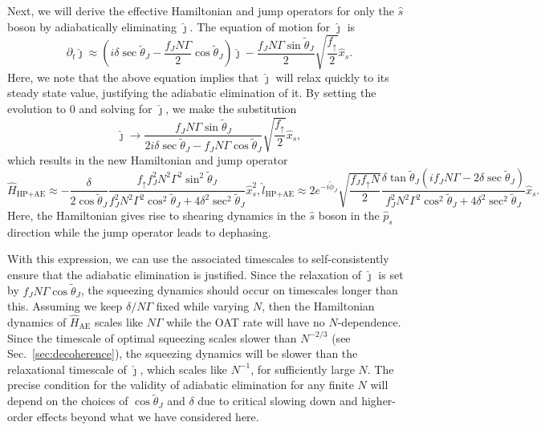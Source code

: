 \documentclass[11pt]{article}
\begin{document}
Next, we will derive the effective Hamiltonian and jump operators for only the $\hat s$ boson by adiabatically eliminating $\hat \jmath$. The equation of motion for $ \hat \jmath $ is
\begin{equation}
    \partial_t \hat \jmath \approx \left(i \delta \sec \tilde{\theta}_J - \frac{f_J N \Gamma}{2} \cos \tilde{\theta}_J \right) \hat \jmath  - \frac{f_J N \Gamma \sin \tilde{\theta}_J}{2}  \sqrt{\frac{f_{\uparrow}}{2}} \hat x_s.
\end{equation}
Here, we note that the above equation implies that $\hat \jmath$ will relax quickly to its steady state value, justifying the adiabatic elimination of it. By setting the evolution to 0 and solving for $\hat \jmath$, we make the substitution
\begin{equation}
    \hat \jmath \to \frac{f_J N \Gamma \sin \tilde{\theta}_J}{2 i \delta \sec \tilde{\theta}_J - f_J N \Gamma \cos \tilde{\theta}_J} \sqrt{\frac{f_{\uparrow}}{2}} \hat x_s,
\end{equation}
which results in the new Hamiltonian and jump operator
\begin{subequations}
    \begin{equation}
        \hat H_{\text{HP+AE}} \approx -\frac{\delta}{2 \cos \tilde{\theta}_J} \frac{ f_\uparrow f_J^2 N^2 \Gamma^2 \sin^2 \tilde{\theta}_J}{f_J^2 N^2 \Gamma^2 \cos^2 \tilde{\theta}_J + 4 \delta^2 \sec^2 \tilde{\theta}_J} \hat{x}_s^2,
    \end{equation}
    \begin{equation}
        \hat{l}_{\text{HP+AE}} \approx 2 e^{-i \tilde{\phi}_J} \sqrt{\frac{f_J f_{\uparrow} N}{2}} \frac{\delta \tan \tilde{\theta}_J (i f_J N \Gamma - 2 \delta \sec \tilde{\theta}_J) }{f_J^2 N^2 \Gamma^2 \cos^2 \tilde{\theta}_J + 4 \delta^2 \sec^2 \tilde{\theta}_J} \hat x_s.
    \end{equation}
\end{subequations}
Here, the Hamiltonian gives rise to shearing dynamics in the $\hat s$ boson in the $\hat p_s$ direction while the jump operator leads to dephasing. 

With this expression, we can use the associated timescales to self-consistently ensure that the adiabatic elimination is justified. Since the relaxation of $\hat \jmath$ is set by $f_J N \Gamma \cos \tilde{\theta}_J$, the squeezing dynamics should occur on timescales longer than this. Assuming we keep $\delta/N \Gamma$ fixed while varying $N$, then the Hamiltonian dynamics of $\hat H_{\text{AE}}$ scales like $N \Gamma$ while the OAT rate will have no $N$-dependence. Since the timescale of optimal squeezing scales slower than $N^{-2/3}$ (see Sec.~\ref{sec:decoherence}), the squeezing dynamics will be slower than the relaxational timescale of $\hat \jmath$, which scales like $N^{-1}$, for sufficiently large $N$. The precise condition for the validity of adiabatic elimination for any finite $N$ will depend on the choices of $\cos \tilde{\theta}_J$ and $\delta$ due to critical slowing down and higher-order effects beyond what we have considered here.
\end{document}
